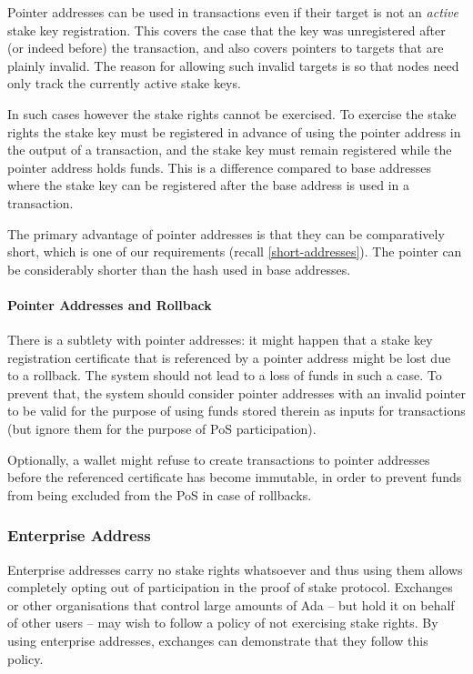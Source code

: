 \documentclass[11pt,a4paper]{article}
\begin{document}
Pointer addresses can be used in transactions even if their target is
not an \emph{active} stake key registration. This covers the case that
the key was unregistered after (or indeed before) the transaction, and
also covers pointers to targets that are plainly invalid. The reason for
allowing such invalid targets is so that nodes need only track the
currently active stake keys.

In such cases however the stake rights cannot be exercised. To exercise
the stake rights the stake key must be registered in advance of using
the pointer address in the output of a transaction, and the stake key
must remain registered while the pointer address holds funds. This is a
difference compared to base addresses where the stake key can be
registered after the base address is used in a transaction.

The primary advantage of pointer addresses is that they can be
comparatively short, which is one of our requirements (recall
\cref{short-addresses}). The pointer can be considerably shorter than
the hash used in base addresses.

\paragraph{Pointer Addresses and Rollback}
There is a subtlety with pointer addresses: it might happen that a
stake key registration certificate that is referenced by a pointer
address might be lost due to a rollback. The system should not lead to
a loss of funds in such a case. To prevent that, the system should
consider pointer addresses with an invalid pointer to be valid for the
purpose of using funds stored therein as inputs for transactions (but
ignore them for the purpose of PoS participation).

Optionally, a wallet might refuse to create transactions to pointer
addresses before the referenced certificate has become immutable, in
order to prevent funds from being excluded from the PoS in case of
rollbacks.

\subsubsection{Enterprise Address}
\label{enterprise-address}

Enterprise addresses carry no stake rights whatsoever and thus using
them allows completely opting out of participation in the proof of stake
protocol. Exchanges or other organisations that control large amounts of
Ada -- but hold it on behalf of other users -- may wish to follow a
policy of not exercising stake rights. By using enterprise addresses,
exchanges can demonstrate that they follow this policy.
\end{document}
